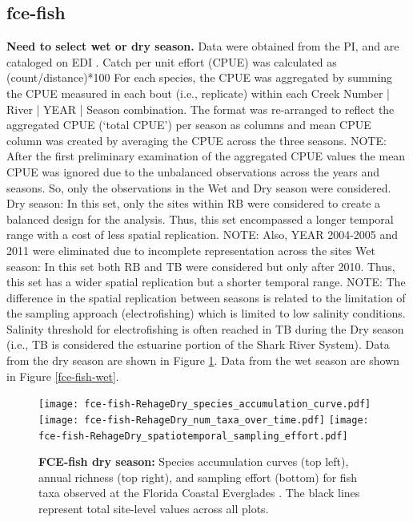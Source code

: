 \documentclass[11pt, oneside]{article}
\begin{document}
\subsection {fce-fish}
{\bf Need to select wet or dry season.}
Data were obtained from the PI, and are cataloged on EDI  \citep{fce-fish}.
Catch per unit effort (CPUE) was calculated as (count/distance)*100
For each species, the CPUE was aggregated by summing the CPUE measured in each bout (i.e., replicate) within each Creek Number | River | YEAR | Season combination.
The format was re-arranged to reflect the aggregated CPUE (`total CPUE') per season as columns and mean CPUE column was created by averaging the CPUE across the three seasons.
NOTE: After the first preliminary examination of the aggregated CPUE values the mean CPUE was ignored due to the unbalanced observations across the years and seasons. 
So, only the observations in the Wet and Dry season were considered.
Dry season: In this set, only the sites within RB were considered to create a balanced design for the analysis. 
Thus, this set encompassed a longer temporal range with a cost of less spatial replication.
NOTE: Also, YEAR 2004-2005 and 2011 were eliminated due to incomplete representation across the sites
Wet season: In this set both RB and TB were considered but only after 2010. Thus, this set has a wider spatial replication but a shorter temporal range.
NOTE: The difference in the spatial replication between seasons is related to the limitation of the sampling approach (electrofishing) which is limited to low salinity conditions. 
Salinity threshold for electrofishing is often reached in TB during the Dry season (i.e., TB is considered the estuarine portion of the Shark River System).
Data from the dry season are shown in Figure \ref{fce-fish-dry}.
Data from the wet season are shown in Figure \ref{fce-fish-wet}.

\begin{figure}[h!]
\centering
\texttt{[image: fce-fish-RehageDry\_species\_accumulation\_curve.pdf]}
\texttt{[image: fce-fish-RehageDry\_num\_taxa\_over\_time.pdf]}
\texttt{[image: fce-fish-RehageDry\_spatiotemporal\_sampling\_effort.pdf]}
\caption{{\bf FCE-fish dry season:} Species accumulation curves (top left),  annual richness (top right), and sampling effort (bottom)  for fish taxa observed at the Florida Coastal Everglades . The black lines represent total site-level values across all plots.}
\label{fce-fish-dry}
\end{figure}
\end{document}
